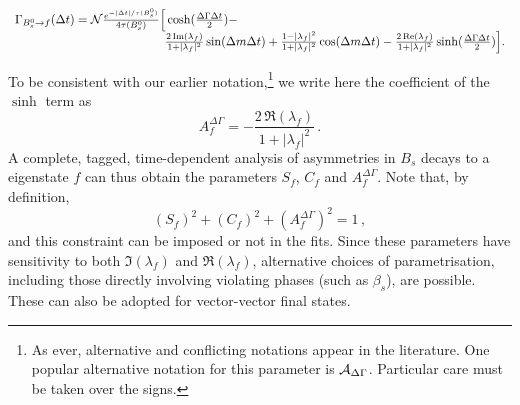 \begin{equation}
  \label{eq:cp_uta:td_cp_bs_asp2}
  \begin{array}{lcr}
    \mc{2}{l}{
      \Gamma_{\Bs \to f} (\Delta t) =
      {\cal N} %
      \frac{e^{-| \Delta t | / \tau(\Bs)}}{4\tau(\Bs)}
      \Big[ 
      \cosh(\frac{\Delta \Gamma \Delta t}{2}) -
    } & \hspace{40mm} \\
    \hspace{40mm} & 
    \mc{2}{r}{
      \frac{2\, \Im(\lambda_f)}{1 + |\lambda_f|^2} \sin(\Delta m \Delta t) +
      \frac{1 - |\lambda_f|^2}{1 + |\lambda_f|^2} \cos(\Delta m \Delta t) -
      \frac{2\, \Re(\lambda_f)}{1 + |\lambda_f|^2} \sinh(\frac{\Delta \Gamma \Delta t}{2})
      \Big]. 
    } \\
  \end{array}
\end{equation}

To be consistent with our earlier notation,\footnote{
  As ever, alternative and conflicting notations appear in the literature.
  One popular alternative notation for this parameter is 
  ${\cal A}_{\Delta \Gamma}$.
  Particular care must be taken over the signs.
}
we write here the coefficient of the $\sinh$ term as
\begin{equation}
  A^{\Delta \Gamma}_f = - \frac{2\, \Re(\lambda_f)}{1 + |\lambda_f|^2} \, .
\end{equation}
A complete, tagged, time-dependent analysis of \CP asymmetries in 
$B_s$ decays to a \CP eigenstate $f$ can thus obtain the parameters 
$S_f$, $C_f$ and $A^{\Delta \Gamma}_f$.
Note that, by definition, 
\begin{equation}
  \left( S_f \right)^2 + \left( C_f \right)^2 + \left( A^{\Delta \Gamma}_f \right)^2 = 1 \, ,
\end{equation}
and this constraint can be imposed or not in the fits.
Since these parameters have sensitivity to both
$\Im(\lambda_f)$ and $\Re(\lambda_f)$,
alternative choices of parametrisation, 
including those directly involving \CP violating phases (such as $\beta_s$), 
are possible.
These can also be adopted for vector-vector final states.


